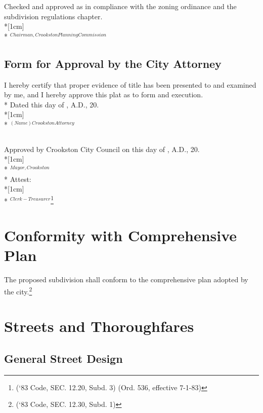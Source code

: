 \subsubsection{}
Checked and approved as in compliance with the zoning ordinance and the subdivision regulations chapter.\\*[1cm]
\fillable{5cm}\\*
$^{Chairman, Crookston Planning Commission}$
\subsection{Form for Approval by the City Attorney}
I hereby certify that proper evidence of title has been presented to and examined by me, and I hereby approve this plat as to form and execution.\\*
Dated this \fillable{1cm} day of \fillable{2cm}, A.D., 20\fillable{1cm}.\\*[1cm]
\fillable{5cm}\\*
$^{(Name) Crookston Attorney}$
\subsection{}
Approved by Crookston City Council on this \fillable{1cm} day of \fillable{2cm}, A.D., 20\fillable{1cm}.\\*[1cm]
\fillable{5cm}\\*
$^{Mayor, Crookston}$\\*
Attest:\\*[1cm]
\fillable{5cm}\\*
$^{Clerk-Treasurer}$\footnote{(‘83 Code, SEC. 12.20, Subd. 3)  (Ord. 536, effective 7-1-83)}


\setcounter{section}{29}
\section{Conformity with Comprehensive Plan}
The proposed subdivision shall conform to the comprehensive plan adopted by the city.\footnote{(‘83 Code, SEC. 12.30, Subd. 1)}

\section{Streets and Thoroughfares}
\subsection{General Street Design}
